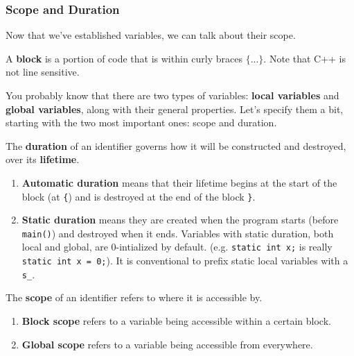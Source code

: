 \documentclass{article}
\begin{document}
    \subsubsection{Scope and Duration} 

      Now that we've established variables, we can talk about their scope. 
      
      \begin{definition}[Block]
        A \textbf{block} is a portion of code that is within curly braces $\texttt{\{ ...\}}$. Note that C++ is not line sensitive.
      \end{definition}

      You probably know that there are two types of variables: \textbf{local variables} and \textbf{global variables}, along with their general properties. Let's specify them a bit, starting with the two most important ones: scope and duration.  

      \begin{definition}[Duration]
        The \textbf{duration} of an identifier governs how it will be constructed and destroyed, over its \textbf{lifetime}. 
        \begin{enumerate}
          \item \textbf{Automatic duration} means that their lifetime begins at the start of the block (at \texttt{\{}) and is destroyed at the end of the block \texttt{\}}. 
          \item \textbf{Static duration} means they are created when the program starts (before \texttt{main()}) and destroyed when it ends. Variables with static duration, both local and global, are 0-intialized by default. (e.g. \texttt{static int x;} is really \texttt{static int x = 0;}). It is conventional to prefix static local variables with a \texttt{s\_}. 
        \end{enumerate}
      \end{definition} 

      \begin{definition}[Scope]
        The \textbf{scope} of an identifier refers to where it is accessible by. 
        \begin{enumerate}
          \item \textbf{Block scope} refers to a variable being accessible within a certain block. 
          \item \textbf{Global scope} refers to a variable being accessible from everywhere.  
        \end{enumerate}
      \end{definition} 
\end{document}
